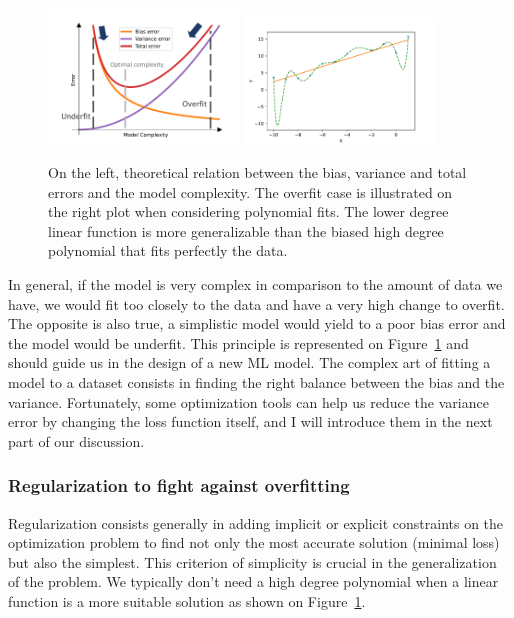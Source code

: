 \documentclass[main]{subfiles}
\begin{document}
\begin{figure}[ht]
  \centering
    \includegraphics[width=0.45\textwidth]{figures/4-ml/Bias_variance_tradeoff.pdf}
    \includegraphics[width=0.45\textwidth]{figures/4-ml/overfit.pdf}
    \caption{On the left, theoretical relation between the bias, variance and total errors and the model complexity. The overfit case is illustrated on the right plot when considering polynomial fits. The lower degree linear function is more generalizable than the biased high degree polynomial that fits perfectly the data.}\label{fgr:bias_variance}
\end{figure}

In general, if the model is very complex in comparison to the amount of data we have, we would fit too closely to the data and have a very high change to overfit. The opposite is also true, a simplistic model would yield to a poor bias error and the model would be underfit. This principle is represented on Figure~\ref{fgr:bias_variance} and should guide us in the design of a new ML model.
The complex art of fitting a model to a dataset consists in finding the right balance between the bias and the variance. Fortunately, some optimization tools can help us reduce the variance error by changing the loss function itself, and I will introduce them in the next part of our discussion.

\subsubsection{Regularization to fight against overfitting}

Regularization consists generally in adding implicit or explicit constraints on the optimization problem to find not only the most accurate solution (minimal loss) but also the simplest. This criterion of simplicity is crucial in the generalization of the problem. We typically don't need a high degree polynomial when a linear function is a more suitable solution as shown on Figure~\ref{fgr:bias_variance}. 
\end{document}
